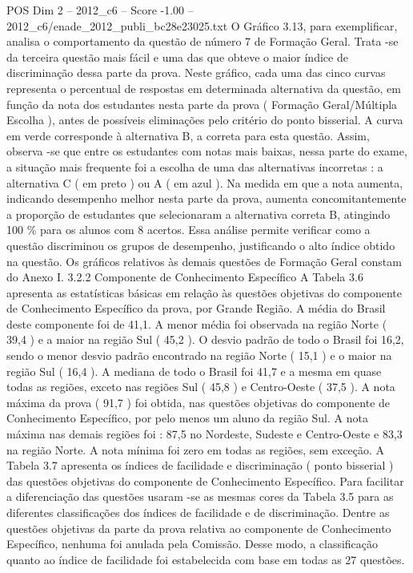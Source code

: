 \begin{textsample}{POS Dim 2 – 2012\_c6 – Score -1.00 – 2012\_c6/enade\_2012\_publi\_bc28e23025.txt}
O Gráfico 3.13, para exemplificar, analisa o comportamento da questão de número 7 de Formação Geral.
Trata -se da terceira questão mais fácil e uma das que obteve o maior índice de discriminação dessa parte da prova.
Neste gráfico, cada uma das cinco curvas representa o percentual de respostas em determinada alternativa da questão, em função da nota dos estudantes nesta parte da prova ( Formação Geral/Múltipla Escolha ), antes de possíveis eliminações pelo critério do ponto bisserial.
A curva em verde corresponde à alternativa B, a correta para esta questão.
Assim, observa -se que entre os estudantes com notas mais baixas, nessa parte do exame, a situação mais frequente foi a escolha de uma das alternativas incorretas : a alternativa C ( em preto ) ou A ( em azul ).
Na medida em que a nota aumenta, indicando desempenho melhor nesta parte da prova, aumenta concomitantemente a proporção de estudantes que selecionaram a alternativa correta B, atingindo 100 \% para os alunos com 8 acertos.
Essa análise permite verificar como a questão discriminou os grupos de desempenho, justificando o alto índice obtido na questão.
Os gráficos relativos às demais questões de Formação Geral constam do Anexo I. 3.2.2 Componente de Conhecimento Específico A Tabela 3.6 apresenta as estatísticas básicas em relação às questões objetivas do componente de Conhecimento Específico da prova, por Grande Região.
A média do Brasil deste componente foi de 41,1.
A menor média foi observada na região Norte ( 39,4 ) e a maior na região Sul ( 45,2 ).
O desvio padrão de todo o Brasil foi 16,2, sendo o menor desvio padrão encontrado na região Norte ( 15,1 ) e o maior na região Sul ( 16,4 ).
A mediana de todo o Brasil foi 41,7 e a mesma em quase todas as regiões, exceto nas regiões Sul ( 45,8 ) e Centro-Oeste ( 37,5 ).
A nota máxima da prova ( 91,7 ) foi obtida, nas questões objetivas do componente de Conhecimento Específico, por pelo menos um aluno da região Sul.
A nota máxima nas demais regiões foi : 87,5 no Nordeste, Sudeste e Centro-Oeste e 83,3 na região Norte.
A nota mínima foi zero em todas as regiões, sem exceção.
A Tabela 3.7 apresenta os índices de facilidade e discriminação ( ponto bisserial ) das questões objetivas do componente de Conhecimento Específico.
Para facilitar a diferenciação das questões usaram -se as mesmas cores da Tabela 3.5 para as diferentes classificações dos índices de facilidade e de discriminação.
Dentre as questões objetivas da parte da prova relativa ao componente de Conhecimento Específico, nenhuma foi anulada pela Comissão.
Desse modo, a classificação quanto ao índice de facilidade foi estabelecida com base em todas as 27 questões.

\end{textsample}
